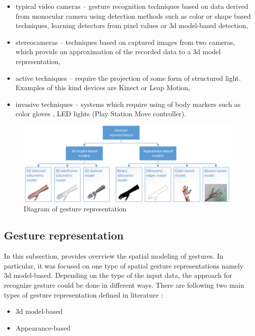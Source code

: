 \begin{itemize}

\item typical video cameras -- gesture recognition techniques based on data derived from monocular camera using detection methods such as color or shape based techniques, learning detectors from pixel values or 3d model-based detection,

\item stereocameras -- techniques based on captured images from two cameras, which provide an approximation of the recorded data to a 3d model representation,

\item active techniques -- require the projection of some form of structured light. Examples of this kind devices are Kinect or Leap Motion,

\item invasive techniques -- systems which require using of body markers such as color gloves \cite{Wang:2009:RHC:1531326.1531369}, LED lights (Play Station Move controller).

\end{itemize}

\begin{figure}[htb]
\centering
 \includegraphics[width=1\columnwidth]{figures/gestureRepresentations.png}
 \caption[]{Diagram of gesture representation}
 \label{gesturerepresentations}
\end{figure}

\subsection{Gesture representation}
In this subsection, provides overview the spatial modeling of gestures. In particular, it was focused on one type of spatial gesture representations namely 3d model-based.
Depending on the type of the input data, the approach for recognize gesture could be done in different ways.
There are following two main types of gesture representation defined in literature \cite{Huang95handgesture}\cite{Pavlovic97visualinterpretation}:
\begin{itemize}
\item 3d model-based
\item Appearance-based
\end{itemize}

